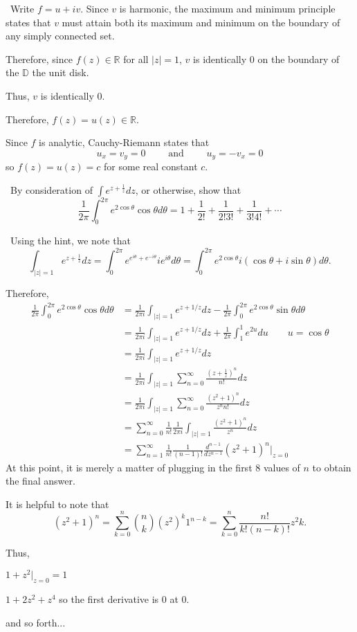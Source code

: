 \documentclass[12pt]{Qual}
\begin{document}
\begin{solution}$\,$
Write $f=u+iv$. Since $v$ is harmonic, the maximum and minimum principle states that $v$ must attain both its maximum and minimum on the boundary of any simply connected set.

Therefore, since $f(z)\in\mathbb{R}$ for all $|z|=1$, $v$ is identically $0$ on the boundary of the $\mathbb{D}$ the unit disk.

Thus, $v$ is identically $0$.

Therefore, $f(z)=u(z)\in\mathbb{R}$.

Since $f$ is analytic, Cauchy-Riemann states that $$u_x=v_y=0\qquad\text{ and }\qquad u_y=-v_x=0$$ so $f(z)=u(z)=c$ for some real constant $c$.
\end{solution}
\newpage





\begin{problem} $\,$
By consideration of $\int e^{z+\frac{1}{z}}dz$, or otherwise, show that $$\frac{1}{2\pi}\int_0^{2\pi}e^{2\cos\theta}\cos\theta d\theta=1+\frac{1}{2!}+\frac{1}{2!3!}+\frac{1}{3!4!}+\cdots$$
\end{problem}


\begin{solution}$\,$
Using the hint, we note that $$\int_{|z|=1}e^{z+\frac{1}{z}}dz=\int_0^{2\pi}e^{e^{i\theta}+e^{-i\theta}}ie^{i\theta}d\theta=\int_0^{2\pi}e^{2\cos\theta}i(\cos\theta+i\sin\theta)d\theta.$$

Therefore, \begin{align*}
  \frac{1}{2\pi}\int_0^{2\pi}e^{2\cos\theta}\cos\theta d\theta&=\frac{1}{2\pi i}\int_{|z|=1}e^{z+1/z}dz-\frac{1}{2\pi}\int_0^{2\pi}e^{2\cos\theta}\sin\theta d\theta\\
  &=\frac{1}{2\pi i}\int_{|z|=1}e^{z+1/z}dz+\frac{1}{2\pi}\int_1^1e^{2u}du\qquad u=\cos\theta\\
  &=\frac{1}{2\pi i}\int_{|z|=1}e^{z+1/z}dz\\
  &=\frac{1}{2\pi i}\int_{|z|=1}\sum_{n=0}^\infty\frac{\left(z+\frac{1}{z}\right)^n}{n!}dz\\
  &=\frac{1}{2\pi i}\int_{|z|=1}\sum_{n=0}^\infty\frac{(z^2+1)^n}{z^nn!}dz\\
  &=\sum_{n=0}^\infty\frac{1}{n!}\frac{1}{2\pi i}\int_{|z|=1}\frac{(z^2+1)^n}{z^n}dz\\
  &=\sum_{n=1}^\infty\frac{1}{n!}\frac{1}{(n-1)!}\frac{d^{n-1}}{dz^{n-1}}(z^2+1)^n\big|_{z=0}
\end{align*}
At this point, it is merely a matter of plugging in the first $8$ values of $n$ to obtain the final answer.

It is helpful to note that $$(z^2+1)^n=\sum_{k=0}^n\binom{n}{k}(z^2)^k1^{n-k}=\sum_{k=0}^n\frac{n!}{k!(n-k)!}z^2k.$$

Thus,

 $1+z^2\big|_{z=0}=1$

 $1+2z^2+z^4$ so the first derivative is $0$ at $0$.

and so forth...
\end{solution}
\end{document}
